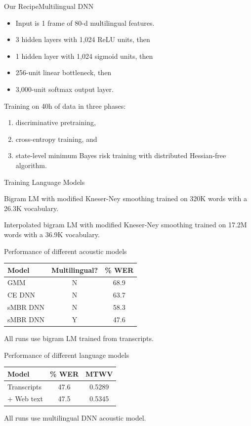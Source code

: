 \begin{frame}{Our Recipe}{Multilingual DNN}
  \begin{itemize}
  \item Input is 1 frame of 80-d multilingual features.
  \item 3 hidden layers with 1,024 ReLU units, then
  \item 1 hidden layer with 1,024 sigmoid units, then
  \item 256-unit linear bottleneck, then
  \item 3,000-unit softmax output layer.
  \end{itemize}
  \vfill
  Training on 40h of data in three phases:
  \begin{enumerate}
  \item discriminative pretraining,
  \item cross-entropy training, and
  \item state-level minimum Bayes risk training with distributed
    Hessian-free algorithm.
  \end{enumerate}
\end{frame}

\begin{frame}{Training Language Models}{}
  \begin{description}[On transcripts]
  \item[On transcripts] Bigram LM with modified Kneser-Ney smoothing
    trained on 320K words with a 26.3K vocabulary.
  \item[Plus web text] Interpolated bigram LM with modified Kneser-Ney
    smoothing trained on 17.2M words with a 36.9K vocabulary.
  \end{description}
\end{frame}

\begin{frame}{Performance of different acoustic models}{}
  \centering
  \begin{tabular}{@{}lcc@{}} \toprule
  {\bf Model} & {\bf Multilingual?} & {\bf \% WER} \\ \midrule
  GMM      & N & 68.9 \\
  CE DNN   & N & 63.7 \\
  sMBR DNN & N & 58.3 \\
  sMBR DNN & Y & 47.6 \\ \bottomrule
  \end{tabular}
  \vfill
  \raggedright
  All runs use bigram LM trained from transcripts.
\end{frame}

\begin{frame}{Performance of different language models}{}
  \centering
  \begin{tabular}{@{}lcc@{}} \toprule
  {\bf Model} & {\bf \% WER} & {\bf MTWV} \\ \midrule
  Transcripts & 47.6 & 0.5289 \\
  + Web text  & 47.5 & 0.5345 \\ \bottomrule
  \end{tabular}
  \vfill
  \raggedright
  All runs use multilingual DNN acoustic model.
\end{frame}
